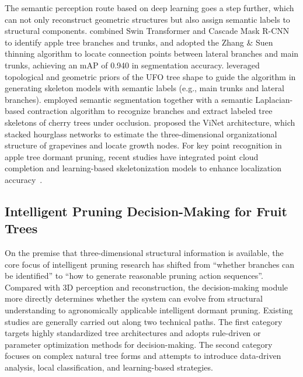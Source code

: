 \documentclass[12pt,a4paper,fontset=fandol]{ctexart}
\begin{document}
The semantic perception route based on deep learning goes a step further, which can not only reconstruct geometric structures but also assign semantic labels to structural components.
\citet{tong2022branch} combined Swin Transformer and Cascade Mask R-CNN to identify apple tree branches and trunks, and adopted the Zhang \& Suen thinning algorithm to locate connection points between lateral branches and main trunks, achieving an mAP of 0.940 in segmentation accuracy.
\citet{you2022semantics} leveraged topological and geometric priors of the UFO tree shape to guide the algorithm in generating skeleton models with semantic labels (e.g., main trunks and lateral branches).
\citet{liu2022semantic} employed semantic segmentation together with a semantic Laplacian-based contraction algorithm to recognize branches and extract labeled tree skeletons of cherry trees under occlusion.
\citet{gentilhomme2023vinet} proposed the ViNet architecture, which stacked hourglass networks to estimate the three-dimensional organizational structure of grapevines and locate growth nodes.
For key point recognition in apple tree dormant pruning, recent studies have integrated point cloud completion and learning-based skeletonization models to enhance localization accuracy~\citep{liu2025fusion,liu2025unet}.

\subsection{Intelligent Pruning Decision-Making for Fruit Trees}

On the premise that three-dimensional structural information is available, the core focus of intelligent pruning research has shifted from ``whether branches can be identified'' to ``how to generate reasonable pruning action sequences''.
Compared with 3D perception and reconstruction, the decision-making module more directly determines whether the system can evolve from structural understanding to agronomically applicable intelligent dormant pruning.
Existing studies are generally carried out along two technical paths.
The first category targets highly standardized tree architectures and adopts rule-driven or parameter optimization methods for decision-making.
The second category focuses on complex natural tree forms and attempts to introduce data-driven analysis, local classification, and learning-based strategies.
\end{document}

